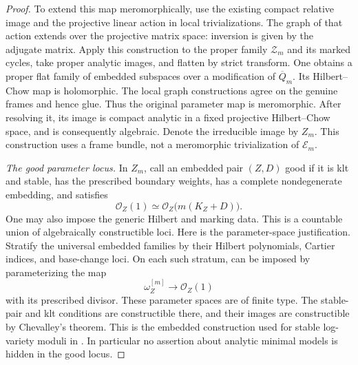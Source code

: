 \begin{proof}
To extend this map meromorphically, use the existing compact relative
image and the projective linear action in local trivializations.
The graph of that action extends over the projective matrix
space: inversion is given by the adjugate matrix.  Apply this construction
to the proper family \(\mathcal Z_m\) and its marked cycles, take proper
analytic images, and flatten by strict transform.  One obtains a proper flat family
of embedded subspaces over a modification of \(\overline Q_m\).
Its Hilbert--Chow map is holomorphic.  The local graph constructions
agree on the genuine frames and hence glue.  Thus the original
parameter map is meromorphic.  After resolving it, its image is
compact analytic in a fixed projective Hilbert--Chow space, and is
consequently algebraic.  Denote the irreducible image by \(Z_m\).
This construction uses a frame bundle, not a meromorphic
trivialization of \(\mathcal E_m\).

\emph{The good parameter locus.}
In \(Z_m\), call an embedded pair \((Z,D)\) good if it is klt and stable,
has the prescribed boundary weights, has a complete nondegenerate
embedding, and satisfies
\begin{equation}\label{generaltype:embedded-adjoint}
  \mathcal O_Z(1)\simeq
       \mathcal O_Z\bigl(m(K_Z+D)\bigr).
\end{equation}
One may also impose the generic Hilbert and marking data.
This is a countable union of algebraically constructible loci.
Here is the parameter-space justification.  Stratify the universal
embedded families by their Hilbert polynomials, Cartier indices,
and base-change loci.  On each such stratum,
 can be imposed by parameterizing
the map
\[
  \omega_Z^{[m]}\longrightarrow\mathcal O_Z(1)
\]
with its prescribed divisor.  These parameter spaces are of finite
type.  The stable-pair and klt conditions are constructible there,
and their images are constructible by Chevalley's theorem.
This is the embedded construction used for stable log-variety
moduli in \cite[Section~6.A, especially Propositions~6.8 and~6.11
and Lemma~6.12]{KovacsPatakfalvi}.  In particular no assertion
about analytic minimal models is hidden in the good locus.


\end{proof}

